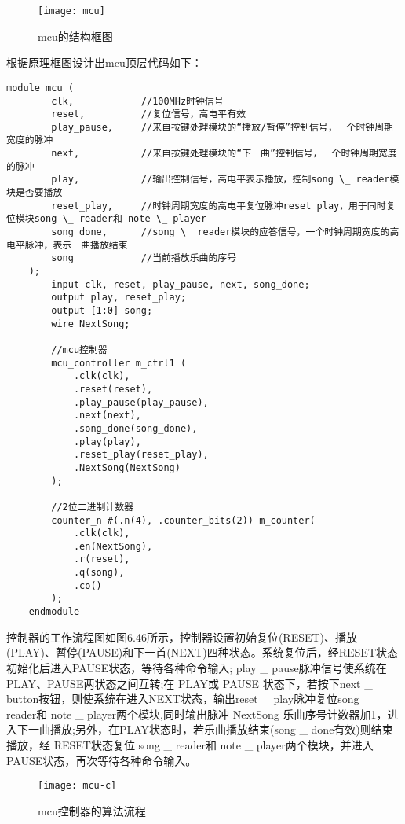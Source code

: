 \documentclass{../source/Experiment}
\begin{document}
                \begin{figure}[H]
                    \centering
                    \texttt{[image: mcu]}
                    \caption{mcu的结构框图}
                \end{figure}

                根据原理框图设计出mcu顶层代码如下：
                \begin{lstlisting}[name = mcu顶层代码]
    module mcu (
        clk,            //100MHz时钟信号
        reset,          //复位信号，高电平有效
        play_pause,     //来自按键处理模块的“播放/暂停”控制信号，一个时钟周期宽度的脉冲
        next,           //来自按键处理模块的“下一曲”控制信号，一个时钟周期宽度的脉冲
        play,           //输出控制信号，高电平表示播放，控制song \_ reader模块是否要播放
        reset_play,     //时钟周期宽度的高电平复位脉冲reset play，用于同时复位模块song \_ reader和 note \_ player
        song_done,      //song \_ reader模块的应答信号，一个时钟周期宽度的高电平脉冲，表示一曲播放结束
        song            //当前播放乐曲的序号
    );
        input clk, reset, play_pause, next, song_done;
        output play, reset_play;
        output [1:0] song;
        wire NextSong;

        //mcu控制器
        mcu_controller m_ctrl1 (
            .clk(clk),
            .reset(reset),
            .play_pause(play_pause),
            .next(next),
            .song_done(song_done),
            .play(play),
            .reset_play(reset_play),
            .NextSong(NextSong)
        );

        //2位二进制计数器
        counter_n #(.n(4), .counter_bits(2)) m_counter(
            .clk(clk),
            .en(NextSong),
            .r(reset),
            .q(song),
            .co()
        );
    endmodule
                \end{lstlisting}
                控制器的工作流程图如图6.46所示，控制器设置初始复位(RESET)、播放(PLAY)、暂停(PAUSE)和下一首(NEXT)四种状态。系统复位后，经RESET状态初始化后进入PAUSE状态，等待各种命令输入; play \_ pause脉冲信号使系统在 PLAY、PAUSE两状态之间互转;在 PLAY或 PAUSE 状态下，若按下next \_ button按钮，则使系统在进入NEXT状态，输出reset \_  play脉冲复位song  \_ reader和 note \_ player两个模块,同时输出脉冲 NextSong 乐曲序号计数器加1，进入下一曲播放;另外，在PLAY状态时，若乐曲播放结束(song \_ done有效)则结束播放，经 RESET状态复位 song \_ reader和 note \_ player两个模块，并进入 PAUSE状态，再次等待各种命令输入。

                \begin{figure}[H]
                    \centering
                    \texttt{[image: mcu-c]}
                    \caption{mcu控制器的算法流程}
                \end{figure}
\end{document}
